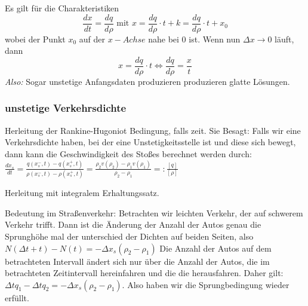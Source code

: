 \documentclass[]{article}
\begin{document}
Es gilt für die Charakteristiken 
\[ \frac{d x}{d t} = \frac{d q}{d \rho} \text{ mit } x = \frac{d q}{d \rho} \cdot t + k = \frac{d q}{d \rho} \cdot t + x_0 \]
wobei der Punkt $x_0$ auf der $x-Achse$ nahe bei 0 ist. Wenn nun $\Delta x \to 0$ läuft, dann
\begin{equation*}
x = \frac{d q}{d \rho} \cdot t \Leftrightarrow \frac{d q}{d \rho} = \frac{x}{t}
\end{equation*}
\textit{Also:} Sogar unstetige Anfangsdaten produzieren produzieren glatte Lösungen.

\subsubsection*{unstetige Verkehrsdichte }
Herleitung der Rankine-Hugoniot Bedingung, falls zeit. Sie Besagt: Falls wir eine Verkehrsdichte haben, bei der eine Unstetigkeitsstelle ist und diese sich bewegt, dann kann die Geschwindigkeit des Stoßes berechnet werden durch: $\frac{d x_s}{d t} = \frac{q(x_s^-, t) - q(x_s^+, t)}{\rho(x_s^-, t) - \rho(x_s^+,t)} = \frac{\rho_2 v(\rho_2) - \rho_1 v(\rho_1)}{\rho_2 - \rho_1} =: \frac{[q]}{[\rho]}$

Herleitung mit integralem Erhaltungssatz. 

Bedeutung im Straßenverkehr: Betrachten wir leichten Verkehr, der auf schwerem Verkehr trifft. Dann ist die Änderung der Anzahl der Autos genau die Sprunghöhe mal der unterschied der Dichten auf beiden Seiten, also $N(\Delta t+ t) - N(t) = -\Delta x_s (\rho_2 - \rho_1)$
Die Anzahl der Autos auf dem betrachteten Intervall ändert sich nur über die Anzahl der Autos, die im betrachteten Zeitintervall hereinfahren und die die herausfahren. Daher gilt: $ \Delta t q_1 - \Delta t q_2 = - \Delta x_s (\rho_2 - \rho_1)$. Also haben wir die Sprungbedingung wieder erfüllt. 
\end{document}
